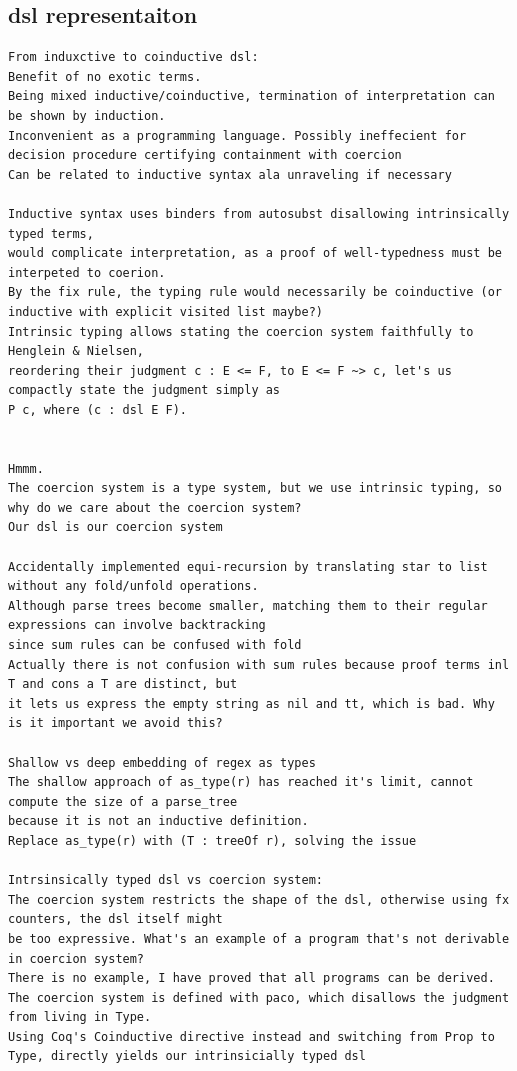 \subsection{dsl representaiton}
\begin{verbatim}
From induxctive to coinductive dsl:
Benefit of no exotic terms.
Being mixed inductive/coinductive, termination of interpretation can be shown by induction.
Inconvenient as a programming language. Possibly ineffecient for decision procedure certifying containment with coercion 
Can be related to inductive syntax ala unraveling if necessary

Inductive syntax uses binders from autosubst disallowing intrinsically typed terms, 
would complicate interpretation, as a proof of well-typedness must be interpeted to coerion.
By the fix rule, the typing rule would necessarily be coinductive (or inductive with explicit visited list maybe?) 
Intrinsic typing allows stating the coercion system faithfully to Henglein & Nielsen,
reordering their judgment c : E <= F, to E <= F ~> c, let's us compactly state the judgment simply as
P c, where (c : dsl E F).


Hmmm.
The coercion system is a type system, but we use intrinsic typing, so why do we care about the coercion system?
Our dsl is our coercion system

Accidentally implemented equi-recursion by translating star to list without any fold/unfold operations.
Although parse trees become smaller, matching them to their regular expressions can involve backtracking
since sum rules can be confused with fold
Actually there is not confusion with sum rules because proof terms inl T and cons a T are distinct, but
it lets us express the empty string as nil and tt, which is bad. Why is it important we avoid this?

Shallow vs deep embedding of regex as types
The shallow approach of as_type(r) has reached it's limit, cannot compute the size of a parse_tree 
because it is not an inductive definition.
Replace as_type(r) with (T : treeOf r), solving the issue

Intrsinsically typed dsl vs coercion system:
The coercion system restricts the shape of the dsl, otherwise using fx counters, the dsl itself might
be too expressive. What's an example of a program that's not derivable in coercion system?
There is no example, I have proved that all programs can be derived.
The coercion system is defined with paco, which disallows the judgment from living in Type.
Using Coq's Coinductive directive instead and switching from Prop to Type, directly yields our intrinsicially typed dsl


\end{verbatim}
